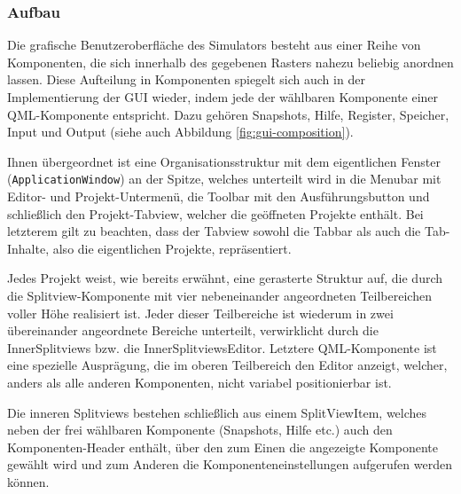 \subsubsection{Aufbau}

Die grafische Benutzeroberfläche des Simulators besteht aus einer Reihe von
Komponenten, die sich innerhalb des gegebenen Rasters nahezu beliebig anordnen
lassen. Diese Aufteilung in Komponenten spiegelt sich auch in der
Implementierung der GUI wieder, indem jede der wählbaren Komponente einer
QML-Komponente entspricht. Dazu gehören Snapshots, Hilfe, Register, Speicher,
Input und Output (siehe auch Abbildung \ref{fig:gui-composition}).

Ihnen übergeordnet ist eine Organisationsstruktur mit dem eigentlichen Fenster
(\texttt{ApplicationWindow}) an der Spitze, welches unterteilt wird in die
Menubar mit Editor- und Projekt-Untermenü, die Toolbar mit den Ausführungsbutton
und schließlich den Projekt-Tabview, welcher die geöffneten Projekte enthält.
Bei letzterem gilt zu beachten, dass der Tabview sowohl die Tabbar als auch die
Tab-Inhalte, also die eigentlichen Projekte, repräsentiert.

Jedes Projekt weist, wie bereits erwähnt, eine gerasterte Struktur auf, die
durch die Splitview-Komponente mit vier nebeneinander angeordneten Teilbereichen
voller Höhe realisiert ist. Jeder dieser Teilbereiche ist wiederum in zwei
übereinander angeordnete Bereiche unterteilt, verwirklicht durch die
InnerSplitviews bzw. die InnerSplitviewsEditor. Letztere QML-Komponente ist eine
spezielle Ausprägung, die im oberen Teilbereich den Editor anzeigt, welcher,
anders als alle anderen Komponenten, nicht variabel positionierbar ist.

Die inneren Splitviews bestehen schließlich aus einem SplitViewItem, welches
neben der frei wählbaren Komponente (Snapshots, Hilfe etc.) auch den
Komponenten-Header enthält, über den zum Einen die angezeigte Komponente gewählt
wird und zum Anderen die Komponenteneinstellungen aufgerufen werden können.

